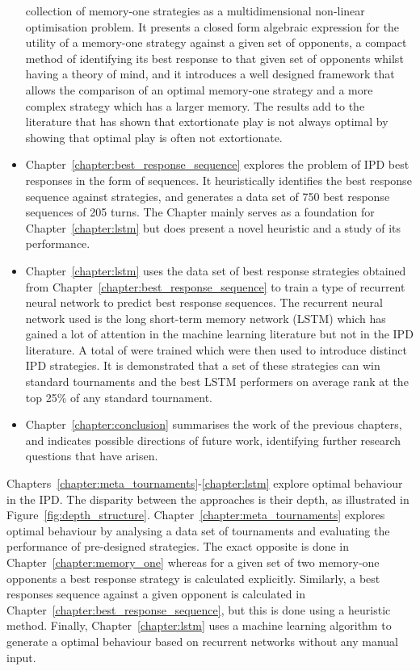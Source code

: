 \begin{itemize}
    collection of memory-one strategies as a multidimensional non-linear
    optimisation problem. It presents a closed form algebraic expression for the
    utility of a memory-one strategy against a given set of opponents, a
    compact method of identifying its best response to that given set of
    opponents whilst having a theory of mind, and it introduces a well designed
    framework that allows the comparison of an optimal memory-one strategy and a
    more complex strategy which has a larger memory. The results add to the
    literature that has shown that extortionate play is not always optimal by
    showing that optimal play is often not extortionate.
    \item Chapter~\ref{chapter:best_response_sequence} explores the problem of
    IPD best responses in the form of sequences.
    It heuristically identifies the best response sequence against \numberofstrategiesbestsequences strategies,
    and generates a data set of 750 best response sequences of 205 turns.
    The Chapter mainly serves as a foundation for Chapter~\ref{chapter:lstm}
    but does present a novel heuristic and a study of its performance.
    \item Chapter~\ref{chapter:lstm} uses the data set of best response
    strategies obtained from Chapter~\ref{chapter:best_response_sequence} to
    train a type of recurrent neural network to predict best response sequences.
    The recurrent neural network used is the long short-term memory network
    (LSTM) which has gained a lot of attention in the machine learning
    literature but not in the IPD literature. A total of \lstmnetworks were
    trained which were then used to introduce \lstmstrategies distinct IPD
    strategies. It is demonstrated that a set of these strategies can win
    standard tournaments and the best LSTM performers on average rank at the top
    25\% of any standard tournament.
    \item Chapter~\ref{chapter:conclusion} summarises the work of the previous
    chapters, and indicates possible directions of future work, identifying
    further research questions that have arisen.
\end{itemize}

Chapters~\ref{chapter:meta_tournaments}-\ref{chapter:lstm} explore optimal
behaviour in the IPD. The disparity between the
approaches is their depth, as illustrated in Figure~\ref{fig:depth_structure}.
Chapter~\ref{chapter:meta_tournaments} explores optimal behaviour
by analysing a data set of tournaments and evaluating the performance of
pre-designed strategies. The exact opposite is done in
Chapter~\ref{chapter:memory_one} whereas for a given set of two
memory-one opponents a best response strategy is calculated explicitly.
Similarly, a best responses sequence against a given opponent is calculated in
Chapter~\ref{chapter:best_response_sequence}, but this is done using a heuristic
method. Finally, Chapter~\ref{chapter:lstm} uses a machine learning algorithm
to generate a optimal behaviour based on recurrent networks without any manual
input.


